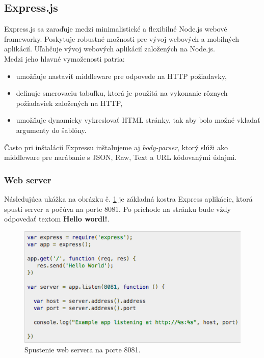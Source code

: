 \subsection{Express.js}
Express.js sa zaraďuje medzi minimalistické a flexibilné Node.js webové frameworky. Poskytuje robustné možnosti pre vývoj webových a mobilných aplikácií. Uľahčuje vývoj webových aplikácií založených na Node.js.\cite{express-tutorial}\\

Medzi jeho hlavné vymoženosti patria:
\begin{itemize}
\item umožňuje nastaviť middleware pre odpovede na HTTP požiadavky,
\item definuje smerovaciu tabuľku, ktorá je použitá na vykonanie rôznych požiadaviek založených na HTTP,
\item umožňuje dynamicky vykreslovať HTML stránky, tak aby bolo možné vkladať argumenty do šablóny.
\end{itemize}

Často pri inštalácií Expressu inštalujeme aj \textit{body-parser}, ktorý slúži ako middleware pre narábanie s JSON, Raw, Text a URL kódovanými údajmi.

\subsubsection{Web server}
Následujúca ukážka na obrázku č. \ref{express-example} je základná kostra Express aplikácie, ktorá spustí server a počúva na porte 8081. Po príchode na stránku bude vždy odpovedať textom \textbf{Hello wordl!}.\cite{express-tutorial}

\begin{figure}[H]
  \centering
  \includegraphics[scale=0.7]{img/express/express-example.png}
  \caption{Spustenie web servera na porte 8081.}
  \label{express-example}
\end{figure}

